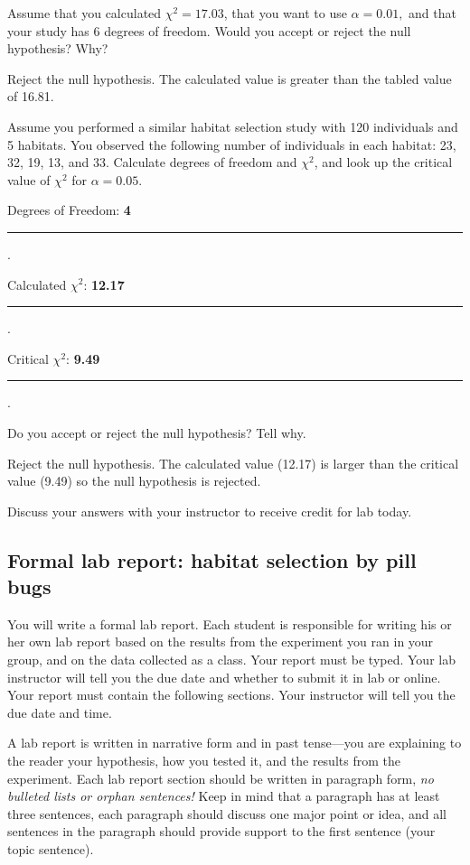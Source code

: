 \documentclass[12pt, hidelinks]{exam}
\newcommand*\AnswerBox[2]{%
    \parbox[t][#1]{0.92\textwidth}{%
    \begin{solution}#2\end{solution}}
    \vspace{\stretch{1}}
}
\newlength{\basespace}
\newcommand\chisq{$\chi^2$}
\newcommand*\AnswerBlank[1]{%
	\ifprintanswers%
		\textbf{#1}
	\else%
		\rule{0.75in}{0.4pt}\kern0.67pt.\fi%
	}
\begin{document}
\begin{questions}
	\question
	Assume that you calculated $\chi^2 = 17.03$, that you want to use $\alpha = 0.01,$ and that your study has 6 degrees of freedom. Would you accept or reject the null hypothesis? Why?

	\AnswerBox{2\basespace}{Reject the null hypothesis. The calculated value is greater than the tabled value of 16.81.}

	\question[Checkout]
	Assume you performed a similar habitat selection study with 120 individuals and 5 habitats. You observed the following number of individuals in each habitat: 23, 32, 19, 13, and 33. Calculate degrees of freedom and \chisq{}, and look up the critical value of \chisq{} for $\alpha = 0.05$.\bigskip
	
	Degrees of Freedom: \AnswerBlank{4} \bigskip 
	
	Calculated \chisq{}: \AnswerBlank{12.17} \bigskip
	
	Critical \chisq{}: \AnswerBlank{9.49}
	
	\question[Checkout]
	Do you accept or reject the null hypothesis?  Tell why.
	
	\AnswerBox{\basespace}{%
		Reject the null hypothesis. The calculated value (12.17) is larger than the critical value (9.49) so the null hypothesis is rejected.
	}
		
	Discuss your answers with your instructor to receive credit for lab today.
	
\end{questions}
	

\subsection*{Formal lab report: habitat selection by pill bugs}

You will write a formal lab report. Each student is responsible for writing his or her own lab report based on
the results from the experiment you ran in your group, and on the data collected as a
class. Your report must be typed. Your lab instructor will tell you the due date and whether to submit it in 
lab or online. Your report must contain the following sections. Your instructor will tell you the due date and time.
 
A lab report is written in narrative form and in past tense—you are
explaining to the reader your hypothesis, how you tested it, and the
results from the experiment. Each lab report section should be written
in paragraph form, \emph{no bulleted lists or orphan sentences!} Keep in
mind that a paragraph has at least three sentences, each paragraph should
discuss one major point or idea, and all sentences in the paragraph
should provide support to the first sentence (your topic sentence).
\end{document}
